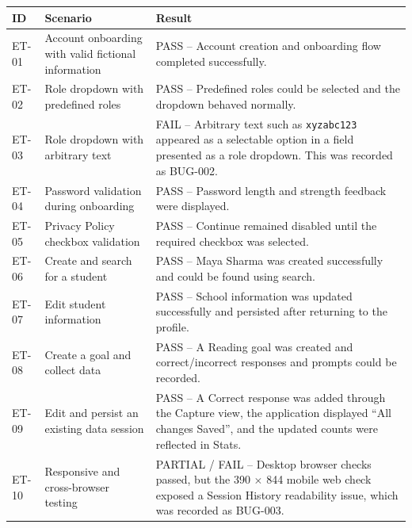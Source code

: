 \documentclass[11pt,a4paper]{article}
\begin{document}
\begin{longtable}{p{}p{}p{}}
\toprule
\textbf{ID} & \textbf{Scenario} & \textbf{Result} \\
\midrule

ET-01 &
Account onboarding with valid fictional information &
PASS -- Account creation and onboarding flow completed successfully. \\

ET-02 &
Role dropdown with predefined roles &
PASS -- Predefined roles could be selected and the dropdown behaved normally. \\

ET-03 &
Role dropdown with arbitrary text &
FAIL -- Arbitrary text such as \texttt{xyzabc123} appeared as a selectable option in a field presented as a role dropdown. This was recorded as BUG-002. \\

ET-04 &
Password validation during onboarding &
PASS -- Password length and strength feedback were displayed. \\

ET-05 &
Privacy Policy checkbox validation &
PASS -- Continue remained disabled until the required checkbox was selected. \\

ET-06 &
Create and search for a student &
PASS -- Maya Sharma was created successfully and could be found using search. \\

ET-07 &
Edit student information &
PASS -- School information was updated successfully and persisted after returning to the profile. \\

ET-08 &
Create a goal and collect data &
PASS -- A Reading goal was created and correct/incorrect responses and prompts could be recorded. \\

ET-09 &
Edit and persist an existing data session &
PASS -- A Correct response was added through the Capture view, the application displayed ``All changes Saved'', and the updated counts were reflected in Stats. \\

ET-10 &
Responsive and cross-browser testing &
PARTIAL / FAIL -- Desktop browser checks passed, but the 390 $\times$ 844 mobile web check exposed a Session History readability issue, which was recorded as BUG-003. \\

\bottomrule
\end{longtable}
\end{document}
